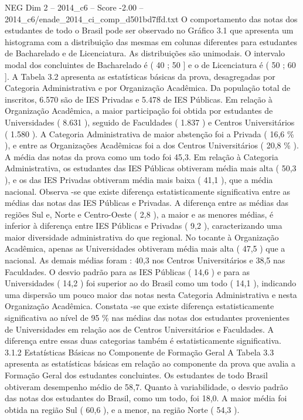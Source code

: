 \begin{textsample}{NEG Dim 2 – 2014\_c6 – Score -2.00 – 2014\_c6/enade\_2014\_ci\_comp\_d501bd7ffd.txt}
O comportamento das notas dos estudantes de todo o Brasil pode ser observado no Gráfico 3.1 que apresenta um histograma com a distribuição das mesmas em colunas diferentes para estudantes de Bacharelado e de Licenciatura.
As distribuições são unimodais.
O intervalo modal dos concluintes de Bacharelado é ( 40 ; 50 ] e o de Licenciatura é ( 50 ; 60 ].
A Tabela 3.2 apresenta as estatísticas básicas da prova, desagregadas por Categoria Administrativa e por Organização Acadêmica.
Da população total de inscritos, 6.570 são de IES Privadas e 5.478 de IES Públicas.
Em relação à Organização Acadêmica, a maior participação foi obtida por estudantes de Universidades ( 8.631 ), seguido de Faculdades ( 1.837 ) e Centros Universitários ( 1.580 ).
A Categoria Administrativa de maior abstenção foi a Privada ( 16,6 \% ), e entre as Organizações Acadêmicas foi a dos Centros Universitários ( 20,8 \% ).
A média das notas da prova como um todo foi 45,3.
Em relação à Categoria Administrativa, os estudantes das IES Públicas obtiveram média mais alta ( 50,3 ), e os das IES Privadas obtiveram média mais baixa ( 41,1 ), que a média nacional.
Observa -se que existe diferença estatisticamente significativa entre as médias das notas das IES Públicas e Privadas.
A diferença entre as médias das regiões Sul e, Norte e Centro-Oeste ( 2,8 ), a maior e as menores médias, é inferior à diferença entre IES Públicas e Privadas ( 9,2 ), caracterizando uma maior diversidade administrativa do que regional.
No tocante à Organização Acadêmica, apenas as Universidades obtiveram média mais alta ( 47,5 ) que a nacional.
As demais médias foram : 40,3 nos Centros Universitários e 38,5 nas Faculdades.
O desvio padrão para as IES Públicas ( 14,6 ) e para as Universidades ( 14,2 ) foi superior ao do Brasil como um todo ( 14,1 ), indicando uma dispersão um pouco maior das notas nesta Categoria Administrativa e nesta Organização Acadêmica.
Constata -se que existe diferença estatisticamente significativa ao nível de 95 \% nas médias das notas dos estudantes provenientes de Universidades em relação aos de Centros Universitários e Faculdades.
A diferença entre essas duas categorias também é estatisticamente significativa. 3.1.2 Estatísticas Básicas no Componente de Formação Geral A Tabela 3.3 apresenta as estatísticas básicas em relação ao componente da prova que avalia a Formação Geral dos estudantes concluintes.
Os estudantes de todo Brasil obtiveram desempenho médio de 58,7.
Quanto à variabilidade, o desvio padrão das notas dos estudantes do Brasil, como um todo, foi 18,0.
A maior média foi obtida na região Sul ( 60,6 ), e a menor, na região Norte ( 54,3 ).

\end{textsample}
